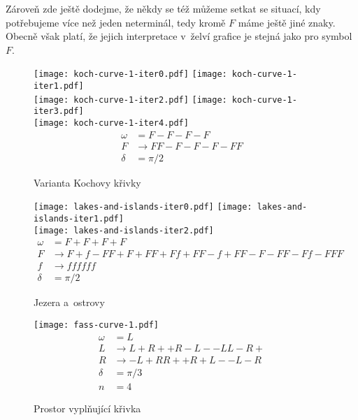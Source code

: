 Zároveň zde ještě dodejme, že někdy se též můžeme setkat se situací, kdy potřebujeme více než jeden neterminál, tedy kromě $F$ máme ještě jiné znaky. Obecně však platí, že jejich interpretace v~želví grafice je stejná jako pro symbol $F$.
\begin{figure}[p]
    \centering
    \texttt{[image: koch-curve-1-iter0.pdf]}\qquad
    \texttt{[image: koch-curve-1-iter1.pdf]}\qquad\\
    \texttt{[image: koch-curve-1-iter2.pdf]}\qquad
    \texttt{[image: koch-curve-1-iter3.pdf]}\qquad\\
    \texttt{[image: koch-curve-1-iter4.pdf]}\qquad
    \begin{align*}
        \omega&=F-F-F-F\\
        F&\to FF-F-F-F-FF\\
        \delta&=\pi/2
    \end{align*}
    \caption{Varianta Kochovy křivky}
    \label{fig:lsystem-varianta-kochovy-krivky}
\end{figure}
\begin{figure}[p]
    \centering
    \texttt{[image: lakes-and-islands-iter0.pdf]}\qquad
    \texttt{[image: lakes-and-islands-iter1.pdf]}\qquad\\
    \texttt{[image: lakes-and-islands-iter2.pdf]}
    \begin{align*}
        \omega&=F+F+F+F\\
        F&\to F+f-FF+F+FF+Ff+FF-f+FF-F-FF-Ff-FFF\\
        f&\to ffffff\\
        \delta&=\pi/2
    \end{align*}
    \caption{Jezera a~ostrovy}
    \label{fig:lsystem-jezera-a-ostrovy}
\end{figure}
\begin{figure}[H]
    \centering
    \texttt{[image: fass-curve-1.pdf]}
    \begin{align*}
        \omega&=L\\
        L&\to L+R++R-L--LL-R+\\
        R&\to -L+RR++R+L--L-R\\
        \delta&=\pi/3\\
        n&=4
    \end{align*}
    \caption{Prostor vyplňující křivka}
    \label{fig:prostor-vyplnujici-krivka}
\end{figure}
